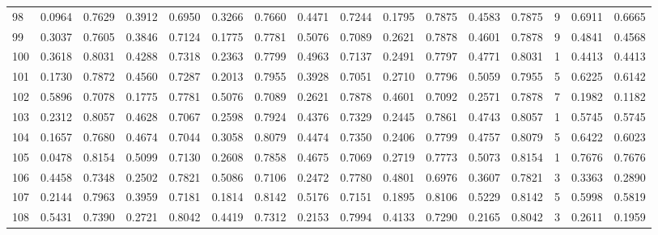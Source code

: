 \begin{tabular}{lrrrrrrrrrrrrrrr}
98  &      0.0964 &  0.7629 &  0.3912 &  0.6950 &  0.3266 &  0.7660 &  0.4471 &  0.7244 &  0.1795 &  0.7875 &   0.4583 &     0.7875 &      9 &                    0.6911 &                     0.6665 \\
99  &      0.3037 &  0.7605 &  0.3846 &  0.7124 &  0.1775 &  0.7781 &  0.5076 &  0.7089 &  0.2621 &  0.7878 &   0.4601 &     0.7878 &      9 &                    0.4841 &                     0.4568 \\
100 &      0.3618 &  0.8031 &  0.4288 &  0.7318 &  0.2363 &  0.7799 &  0.4963 &  0.7137 &  0.2491 &  0.7797 &   0.4771 &     0.8031 &      1 &                    0.4413 &                     0.4413 \\
101 &      0.1730 &  0.7872 &  0.4560 &  0.7287 &  0.2013 &  0.7955 &  0.3928 &  0.7051 &  0.2710 &  0.7796 &   0.5059 &     0.7955 &      5 &                    0.6225 &                     0.6142 \\
102 &      0.5896 &  0.7078 &  0.1775 &  0.7781 &  0.5076 &  0.7089 &  0.2621 &  0.7878 &  0.4601 &  0.7092 &   0.2571 &     0.7878 &      7 &                    0.1982 &                     0.1182 \\
103 &      0.2312 &  0.8057 &  0.4628 &  0.7067 &  0.2598 &  0.7924 &  0.4376 &  0.7329 &  0.2445 &  0.7861 &   0.4743 &     0.8057 &      1 &                    0.5745 &                     0.5745 \\
104 &      0.1657 &  0.7680 &  0.4674 &  0.7044 &  0.3058 &  0.8079 &  0.4474 &  0.7350 &  0.2406 &  0.7799 &   0.4757 &     0.8079 &      5 &                    0.6422 &                     0.6023 \\
105 &      0.0478 &  0.8154 &  0.5099 &  0.7130 &  0.2608 &  0.7858 &  0.4675 &  0.7069 &  0.2719 &  0.7773 &   0.5073 &     0.8154 &      1 &                    0.7676 &                     0.7676 \\
106 &      0.4458 &  0.7348 &  0.2502 &  0.7821 &  0.5086 &  0.7106 &  0.2472 &  0.7780 &  0.4801 &  0.6976 &   0.3607 &     0.7821 &      3 &                    0.3363 &                     0.2890 \\
107 &      0.2144 &  0.7963 &  0.3959 &  0.7181 &  0.1814 &  0.8142 &  0.5176 &  0.7151 &  0.1895 &  0.8106 &   0.5229 &     0.8142 &      5 &                    0.5998 &                     0.5819 \\
108 &      0.5431 &  0.7390 &  0.2721 &  0.8042 &  0.4419 &  0.7312 &  0.2153 &  0.7994 &  0.4133 &  0.7290 &   0.2165 &     0.8042 &      3 &                    0.2611 &                     0.1959 \\

\end{tabular}
